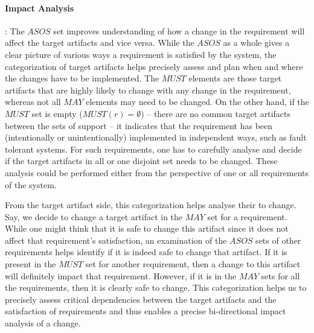 \paragraph{Impact Analysis}: The $ASOS$ set improves understanding of how a change in the requirement will affect the target artifacts and vice versa. While the $ASOS$ as a whole gives a clear picture of various ways a requirement is satisfied by the system, the categorization of target artifacts helps precisely assess and plan when and where the changes have to be implemented. The $MUST$ elements are those target artifacts that are highly likely to change with any change in the requirement, whereas not all $MAY$ elements may need to be changed. On the other hand, if the $MUST$ set is empty ($MUST(r) = \emptyset$) -- there are no common target artifacts between the sets of support -- it indicates that the requirement has been (intentionally or unintentionally) implemented in independent ways, such as fault tolerant systems. For such requirements, one has to carefully analyse and decide if the target artifacts in all or one disjoint set needs to be changed. These analysis could be performed either from the perspective of one or all requirements of the system.


From the target artifact side, this categorization helps analyse their  to change. Say, we decide to change a target artifact in the $MAY$ set for a requirement. While one might think that it is safe to change this artifact since it does not affect that requirement's satisfaction, an examination of the $ASOS$ sets of other requirements helps identify if it is indeed safe to change that artifact. If it is present in the $MUST$ set for another requirement, then a change to this artifact will definitely impact that requirement. However, if it is in the $MAY$ sets for all the requirements, then it is clearly safe to change. This categorization helps us to precisely assess critical dependencies between the target artifacts and the satisfaction of requirements and thus enables a precise bi-directional impact analysis of a change.


